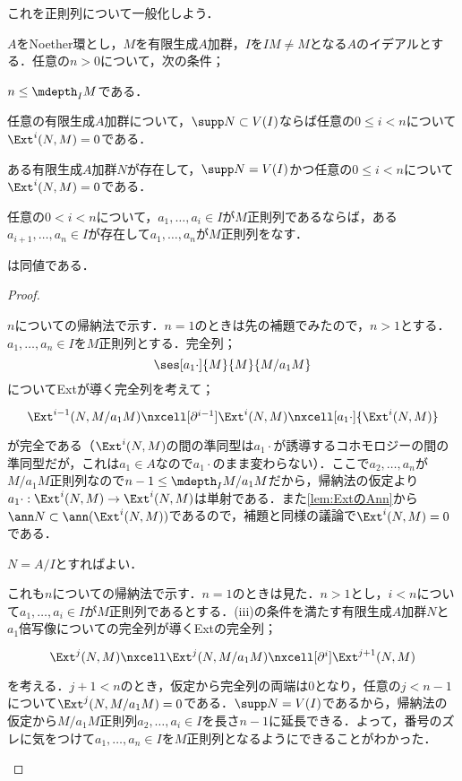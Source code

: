 これを正則列について一般化しよう．

\begin{prop}\label{prop:正則列とExt}
	$A$をNoether環とし，$M$を有限生成$A$加群，$I$を$IM\neq M$となる$A$のイデアルとする．任意の$n>0$について，次の条件；
	\begin{sakura}
		\item $n\leq\mdepth_I M$である．
		\item 任意の有限生成$A$加群について，$\supp N\subset V(I)$ならば任意の$0\leq i<n$について$\Ext^i(N,M)=0$である．
		\item ある有限生成$A$加群$N$が存在して，$\supp N=V(I)$かつ任意の$0\leq i<n$について$\Ext^i(N,M)=0$である．
		\item 任意の$0<i<n$について，$a_1,\dots,a_i\in I$が$M$正則列であるならば，ある$a_{i+1},\dots,a_n\in I$が存在して$a_1,\dots,a_n$が$M$正則列をなす．
	\end{sakura}
	は同値である．
\end{prop}

\begin{proof}
	\begin{eqv}[4]
		\item $n$についての帰納法で示す．$n=1$のときは先の補題でみたので，$n>1$とする．$a_1,\dots,a_n\in I$を$M$正則列とする．完全列；
		\[\ses[a_1\cdot]{M}{M}{M/a_1M}\]
		についてExtが導く完全列を考えて；
		\[\begin{tikzcd}{\Ext^{i-1}(N,M/a_1M)}\nxcell[\partial^{i-1}]{\Ext^i(N,M)}\nxcell[a_1\cdot]{\Ext^i(N,M)}\end{tikzcd}\]
		が完全である（$\Ext^i(N,M)$の間の準同型は$a_1\cdot$が誘導するコホモロジーの間の準同型だが，これは$a_1\in A$なので$a_1\cdot$のまま変わらない）．ここで$a_2,\dots,a_n$が$M/a_1M$正則列なので$n-1\leq\mdepth_I M/a_1M$だから，帰納法の仮定より$a_1\cdot:\Ext^i(N,M)\to\Ext^i(N,M)$は単射である．また\ref{lem:ExtのAnn}から$\ann N\subset\ann(\Ext^i(N,M))$であるので，補題と同様の議論で$\Ext^i(N,M)=0$である．
		\item $N=A/I$とすればよい．
		\item これも$n$についての帰納法で示す．$n=1$のときは見た．$n>1$とし，$i<n$について$a_1,\dots,a_i\in I$が$M$正則列であるとする．(iii)の条件を満たす有限生成$A$加群$N$と$a_1$倍写像についての完全列が導くExtの完全列；
		\[\begin{tikzcd}
		\Ext^{j}(N,M)\nxcell\Ext^{j}(N,M/a_1M)\nxcell[\partial^i]\Ext^{j+1}(N,M)
		\end{tikzcd}\]
		を考える．$j+1<n$のとき，仮定から完全列の両端は$0$となり，任意の$j<n-1$について$\Ext^j(N,M/a_1M)=0$である．$\supp N=V(I)$であるから，帰納法の仮定から$M/a_1M$正則列$a_2,\dots,a_i\in I$を長さ$n-1$に延長できる．よって，番号のズレに気をつけて$a_1,\dots,a_n\in I$を$M$正則列となるようにできることがわかった．
	\end{eqv}
\end{proof}

